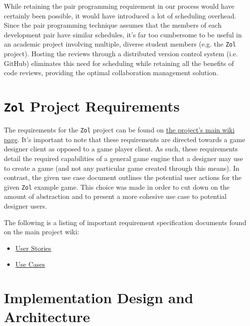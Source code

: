 \documentclass{article}
\newcommand{\projectname}[0] {\texttt{Zol} }
\begin{document}
		While retaining the pair programming requirement in our process would
		have certainly been possible, it would have introduced a lot of
		scheduling overhead.  Since the pair programming technique assumes that
		the members of each development pair have similar schedules, it's far
		too cumbersome to be useful in an academic project involving multiple,
		diverse student members (e.g. the \projectname project).  Hosting the
		reviews through a distributed version control system (i.e. GitHub)
		eliminates this need for scheduling while retaining all the benefits
		of code reviews, providing the optimal collaboration management solution.


	\section[Requirements]{\projectname Project Requirements}
	The requirements for the \projectname project can be found on
    \href{https://github.com/NintenJoe/zol/wiki}{{\color{blue}\underline{the project's main wiki page}}}.
	It's important to note that these requirements are directed towards a game
	designer client as opposed to a game player client.  As such, these
	requirements detail the required capabilities of a general game engine that
	a designer may use to create a game (and not any particular game created
	through this means).  In contrast, the given use case document outlines
	the potential user actions for the given \projectname example game.  This
	choice was made in order to cut down on the amount of abstraction and to
	present a more cohesive use case to potential designer users.

	The following is a listing of important requirement specification documents
	found on the main project wiki:

	\begin{itemize}
        \item \href{https://github.com/NintenJoe/zol/wiki#project-requirements-user-stories}{{\color{blue}\underline{User Stories}}}
        \item \href{https://wiki.engr.illinois.edu/download/attachments/233410967/use-cases.pdf}{{\color{blue}\underline{Use Cases}}}
	\end{itemize}


	\section[Architecture and Design]{Implementation Design and Architecture}
\end{document}
